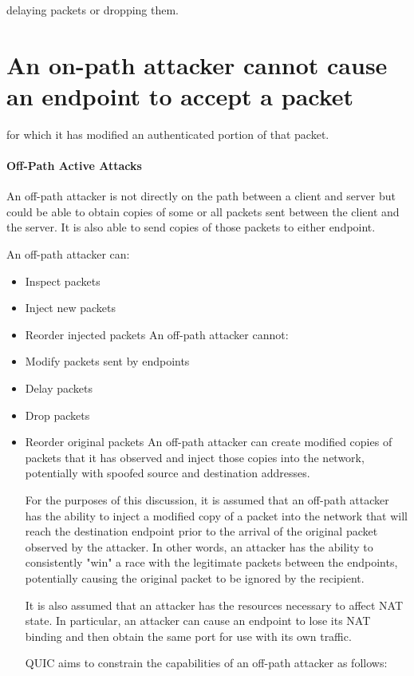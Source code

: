 \documentclass{article}
\begin{document}
delaying packets or dropping them.

\section{An on-path attacker cannot cause an endpoint to accept a packet}

for which it has modified an authenticated portion of that packet.

\paragraph{Off-Path Active Attacks}

An off-path attacker is not directly on the path between a client and server but could be able to obtain copies of some or all packets sent between the client and the server.  It is also able to send copies of those packets to either endpoint.

An off-path attacker can:

\begin{itemize}
\item Inspect packets
\item Inject new packets
\item Reorder injected packets
An off-path attacker cannot:

\item Modify packets sent by endpoints
\item Delay packets
\item Drop packets
\item Reorder original packets
An off-path attacker can create modified copies of packets that it has observed and inject those copies into the network, potentially with spoofed source and destination addresses.

For the purposes of this discussion, it is assumed that an off-path attacker has the ability to inject a modified copy of a packet into the network that will reach the destination endpoint prior to the arrival of the original packet observed by the attacker.  In other words, an attacker has the ability to consistently "win" a race with the legitimate packets between the endpoints, potentially causing the original packet to be ignored by the recipient.

It is also assumed that an attacker has the resources necessary to affect NAT state.  In particular, an attacker can cause an endpoint to lose its NAT binding and then obtain the same port for use with its own traffic.

QUIC aims to constrain the capabilities of an off-path attacker as follows:

\end{itemize}
\end{document}
